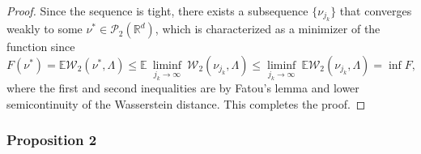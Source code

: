 \documentclass[11pt]{article}
\newcommand{\calP}{\mathcal{P}}
\newcommand{\calW}{\mathcal{W}}
\newcommand{\bbE}{\mathbb{E}}
\newcommand{\Rd}{\mathbb{R}^d}
\begin{document}
\begin{proof}
	Since the sequence is tight, there exists a subsequence $\lbrace \nu_{j_k}\rbrace$ that converges weakly to some $\nu^* \in \calP_2 (\Rd)$, which is characterized as a minimizer of the function since
	\begin{equation*}
	F(\nu^*) = \bbE \calW_2 (\nu^*, \Lambda) \leq \bbE ~ \underset{j_k \rightarrow \infty}{\liminf} ~\calW_2 (\nu_{j_k},\Lambda) \leq \underset{j_k \rightarrow \infty}{\liminf} ~\bbE \calW_2 (\nu_{j_k},\Lambda) = \inf F,
	\end{equation*}
	where the first and second inequalities are by Fatou's lemma and lower semicontinuity of the Wasserstein distance. This completes the proof. 
\end{proof}


\subsubsection*{Proposition 2}
\end{document}
